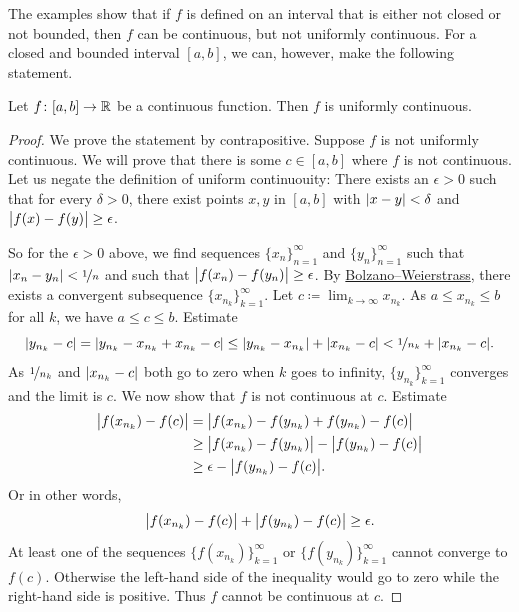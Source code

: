 The examples show that if $f$ is defined on an interval that is either not closed
or not bounded, then $f$ can be continuous, but not uniformly continuous.
For a closed and bounded interval $[a,b]$, we can, however,
make the following statement.

\begin{thm} \label{unifcont:thm}
Let $f \colon [a,b] \to {\mathbb{R}}$ be a continuous function.  Then $f$
is uniformly continuous.
\end{thm}

\begin{proof}
We prove the statement by contrapositive.
Suppose $f$ is not uniformly continuous.  We will prove
that there is some
$c \in [a,b]$ where $f$ is not continuous.  Let us negate
the definition of uniform continuouity:
There exists an $\epsilon > 0$
such that for every $\delta > 0$, there exist points $x, y$ in $[a,b]$ with
$\lvert {x-y} \rvert < \delta$ and $\bigl\lvert {f(x)-f(y)} \bigr\rvert \geq \epsilon$.

So for the $\epsilon > 0$ above,
we find sequences $\{ x_n \}_{n=1}^\infty$ and $\{ y_n \}_{n=1}^\infty$ such that
$\lvert {x_n-y_n} \rvert < \nicefrac{1}{n}$ and such that $\bigl\lvert {f(x_n)-f(y_n)} \bigr\rvert \geq
\epsilon$.  By
\hyperref[thm:bwseq]{Bolzano--Weierstrass},
there exists a convergent subsequence
$\{ x_{n_k} \}_{k=1}^\infty$.  Let $c \coloneqq \lim_{k\to\infty} x_{n_k}$.
As $a \leq x_{n_k} \leq b$ for all $k$, we have $a \leq c \leq b$.  Estimate
\begin{equation*}
\lvert {y_{n_k} - c} \rvert =
\lvert {y_{n_k} - x_{n_k} + x_{n_k} - c} \rvert \leq
\lvert {y_{n_k} - x_{n_k}} \rvert
+
\lvert {x_{n_k}-c} \rvert
<
\nicefrac{1}{n_k} 
+
\lvert {x_{n_k}-c} \rvert .
\end{equation*}
As $\nicefrac{1}{n_k}$ and $\lvert {x_{n_k}-c} \rvert$ both go to zero when
$k$ goes to infinity, $\{ y_{n_k} \}_{k=1}^\infty$ converges and the limit
is $c$.  We now show that $f$ is not continuous at $c$.
Estimate
\begin{equation*}
\begin{split}
\bigl\lvert {f(x_{n_k}) - f(c)} \bigr\rvert & =
\bigl\lvert {f(x_{n_k}) - f(y_{n_k}) + f(y_{n_k}) - f(c)} \bigr\rvert \\
& \geq
\bigl\lvert {f(x_{n_k}) - f(y_{n_k})} \bigr\rvert - \bigl\lvert {f(y_{n_k}) - f(c)} \bigr\rvert \\
& \geq
\epsilon - \bigl\lvert {f(y_{n_k})-f(c)} \bigr\rvert .
\end{split}
\end{equation*}
Or in other words,
\begin{equation*}
\bigl\lvert {f(x_{n_k})-f(c)} \bigr\rvert 
+
\bigl\lvert {f(y_{n_k})-f(c)} \bigr\rvert  \geq
\epsilon .
\end{equation*}
At least one of the sequences $\bigl\{ f(x_{n_k}) \bigr\}_{k=1}^\infty$  or
$\bigl\{ f(y_{n_k}) \bigr\}_{k=1}^\infty$ cannot converge to $f(c)$.
Otherwise the
left-hand side of the inequality would go to zero while the right-hand side is positive.
Thus $f$ cannot be continuous at $c$.
\end{proof}

